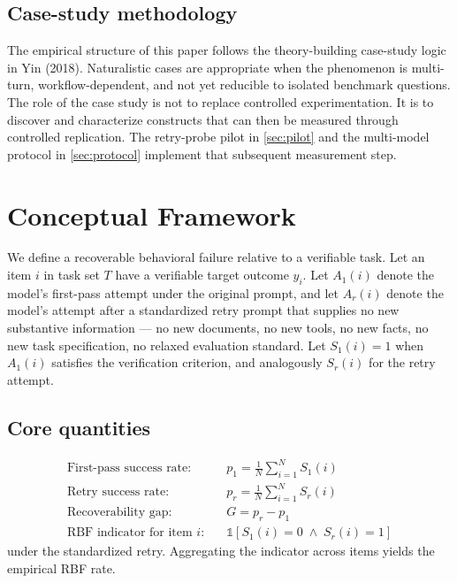 \documentclass[11pt]{article}
\newcommand{\Sone}{S_{1}}
\newcommand{\Sr}{S_{r}}
\newcommand{\pone}{p_{1}}
\newcommand{\pr}{p_{r}}
\begin{document}
\subsection{Case-study methodology}
The empirical structure of this paper follows the theory-building case-study logic in Yin (2018). Naturalistic cases are appropriate when the phenomenon is multi-turn, workflow-dependent, and not yet reducible to isolated benchmark questions. The role of the case study is not to replace controlled experimentation. It is to discover and characterize constructs that can then be measured through controlled replication. The retry-probe pilot in \cref{sec:pilot} and the multi-model protocol in \cref{sec:protocol} implement that subsequent measurement step.

\section{Conceptual Framework}

We define a recoverable behavioral failure relative to a verifiable task. Let an item $i$ in task set $T$ have a verifiable target outcome $y_i$. Let $A_1(i)$ denote the model's first-pass attempt under the original prompt, and let $A_r(i)$ denote the model's attempt after a standardized retry prompt that supplies no new substantive information --- no new documents, no new tools, no new facts, no new task specification, no relaxed evaluation standard. Let $\Sone(i) = 1$ when $A_1(i)$ satisfies the verification criterion, and analogously $\Sr(i)$ for the retry attempt.

\subsection{Core quantities}
\begin{align}
\text{First-pass success rate:}\quad & \pone = \frac{1}{N} \sum_{i=1}^{N} \Sone(i) \\
\text{Retry success rate:}\quad     & \pr   = \frac{1}{N} \sum_{i=1}^{N} \Sr(i)   \\
\text{Recoverability gap:}\quad     & G     = \pr - \pone \\
\text{RBF indicator for item $i$:}\quad & \mathbb{1}\!\left[\Sone(i) = 0 \;\wedge\; \Sr(i) = 1\right]
\end{align}
under the standardized retry. Aggregating the indicator across items yields the empirical RBF rate.
\end{document}
